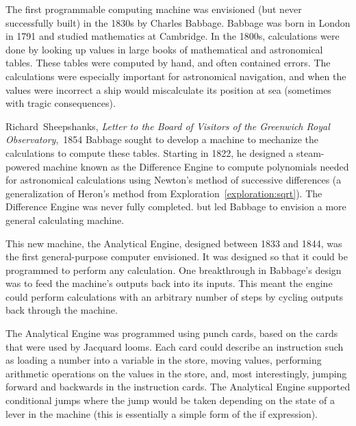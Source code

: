 \begin{schemeregion}
The first programmable computing machine was envisioned (but never successfully built) in the 1830s by Charles Babbage.%
Babbage was born in London in 1791 and studied mathematics at Cambridge.  In the 1800s, calculations were done by looking up values in large books of mathematical and astronomical tables.  These tables were computed by hand, and often contained errors.   The calculations were especially important for astronomical navigation, and when the values were incorrect a ship would miscalculate its position at sea (sometimes with tragic consequences).  

{Richard~Sheepshanks, \emph{Letter to the Board of Visitors of the Greenwich Royal Observatory},~1854}
Babbage sought to develop a machine to mechanize the calculations to compute these tables.  Starting in 1822, he designed a steam-powered machine known as the Difference Engine to compute polynomials needed for astronomical calculations using Newton's method of successive differences (a generalization of Heron's method from Exploration~\ref{exploration:sqrt}).  
The Difference Engine was never fully completed. but led Babbage to envision a more general calculating machine.

This new machine, the Analytical Engine, designed between 1833 and 1844, was the first general-purpose computer envisioned.  It was designed so that it could be programmed to perform any calculation.  One breakthrough in Babbage's design was to feed the machine's outputs back into its inputs.  This meant the engine could perform calculations with an arbitrary number of steps by cycling outputs back through the machine. 

The Analytical Engine was programmed using punch cards, based on the cards that were used by Jacquard looms.   Each card could describe an instruction such as loading a number into a variable in the store, moving values, performing arithmetic operations on the values in the store, and, most interestingly, jumping forward and backwards in the instruction cards.  
The Analytical Engine supported conditional jumps where the jump would be taken depending on the state of a lever in the machine (this is essentially a simple form of the if expression). 


\end{schemeregion}
